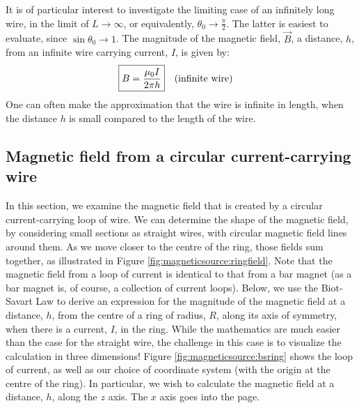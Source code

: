 It is of particular interest to investigate the limiting case of an infinitely long wire, in the limit of $L\to\infty$, or equivalently, $\theta_0\to\frac{\pi}{2}$. The latter is easiest to evaluate, since $\sin\theta_0\to 1$. The magnitude of the magnetic field, $\vec B$, a distance, $h$, from an infinite wire carrying current, $I$, is given by:
\begin{align*}
\Aboxed{ B &= \frac{\mu_0 I}{2\pi h}}\quad\text{(infinite wire)}
\end{align*}
One can often make the approximation that the wire is infinite in length, when the distance $h$ is small compared to the length of the wire. 
\subsection{Magnetic field from a circular current-carrying wire}
In this section, we examine the magnetic field that is created by a circular current-carrying loop of wire. We can determine the shape of the magnetic field, by considering small sections as straight wires, with circular magnetic field lines around them. As we move closer to the centre of the ring, those fields sum together, as illustrated in Figure \ref{fig:magneticsource:ringfield}. Note that the magnetic field from a loop of current is identical to that from a bar magnet (as a bar magnet is, of course, a collection of current loops).   
Below, we use the Biot-Savart Law to derive an expression for the magnitude of the magnetic field at a distance, $h$, from the centre of a ring of radius, $R$, along its axis of symmetry, when there is a current, $I$, in the ring. While the mathematics are much easier than the case for the straight wire, the challenge in this case is to visualize the calculation in three dimensions! Figure \ref{fig:magneticsource:bsring} shows the loop of current, as well as our choice of coordinate system (with the origin at the centre of the ring). In particular, we wish to calculate the magnetic field at a distance, $h$, along the $z$ axis. The $x$ axis goes into the page. 
